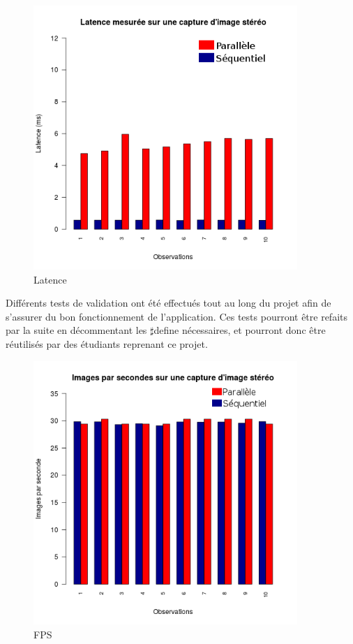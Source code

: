 \begin{figure}[!h]
\centering
\includegraphics[width=\textwidth, height=10cm]{Modules/Picture/latence.png}
\caption{Latence}
\label{latence}
\end{figure}

Différents tests de validation ont été effectués tout au long du projet afin de s'assurer du bon fonctionnement de l'application. Ces tests pourront être refaits par la suite en décommentant les $\sharp$define nécessaires, et pourront donc être réutilisés par des étudiants reprenant ce projet.

\begin{figure}[!h]
\centering
\includegraphics[width=\textwidth, height=10cm]{Modules/Picture/fps.png}
\caption{FPS}
\label{fps}
\end{figure}

